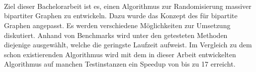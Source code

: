 \chapter*{}


~\\

Ziel dieser Bachelorarbeit ist es, einen  Algorithmus
zur Randomisierung massiver bipartiter Graphen zu entwickeln. Dazu 
wurde das Konzept des \gc{} für bipartite Graphen
angepasst. Es werden verschiedene Möglichkeiten zur Umsetzung diskutiert.
Anhand von Benchmarks wird unter den getesteten Methoden diejenige ausgewählt,
welche die geringste Laufzeit aufweist.
Im Vergleich zu dem schon existierenden \gc{} Algorithmus 
wird mit dem in dieser Arbeit entwickelten Algorithmus 
auf manchen Testinstanzen ein Speedup von bis zu 17 erreicht.



